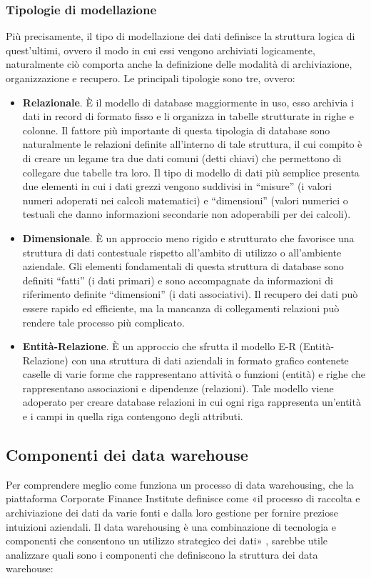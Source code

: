 \subsubsection{Tipologie di modellazione}

Più precisamente, il tipo di modellazione dei dati definisce la struttura logica di quest'ultimi, ovvero il modo in cui essi vengono archiviati logicamente, naturalmente ciò comporta anche la definizione delle modalità di archiviazione, organizzazione e recupero.  Le principali tipologie sono tre, ovvero:\cite{sap_data_modeling}

\begin{itemize}
    \item \textbf{Relazionale}. È il modello di database maggiormente in uso, esso archivia i dati in record di formato fisso e li organizza in tabelle strutturate in righe e colonne. Il fattore più importante di questa tipologia di database sono naturalmente le relazioni definite all'interno di tale struttura, il cui compito è di creare un legame tra due dati comuni (detti chiavi) che permettono di collegare due tabelle tra loro. Il tipo di modello di dati più semplice presenta due elementi in cui i dati grezzi vengono suddivisi in “misure” (i valori numeri adoperati nei calcoli matematici) e “dimensioni” (valori numerici o testuali che danno informazioni secondarie non adoperabili per dei calcoli).
    \item \textbf{Dimensionale}. È un approccio meno rigido e strutturato che favorisce una struttura di dati contestuale rispetto all'ambito di utilizzo o all'ambiente aziendale. Gli elementi fondamentali di questa struttura di database sono definiti “fatti” (i dati primari) e sono accompagnate da informazioni di riferimento definite “dimensioni” (i dati associativi). Il recupero dei dati può essere rapido ed efficiente, ma la mancanza di collegamenti relazioni può rendere tale processo più complicato. 
    \item \textbf{Entità-Relazione}. È un approccio che sfrutta il modello E-R (Entità-Relazione) con una struttura di dati aziendali in formato grafico contenete caselle di varie forme che rappresentano attività o funzioni (entità) e righe che rappresentano associazioni e dipendenze (relazioni). Tale modello viene adoperato per creare database relazioni in cui ogni riga rappresenta un'entità e i campi in quella riga contengono degli attributi.
\end{itemize}

\subsection{Componenti dei data warehouse}
Per comprendere meglio come funziona un processo di data warehousing, che la piattaforma Corporate Finance Institute definisce come «il processo di raccolta e archiviazione dei dati da varie fonti e dalla loro gestione per fornire preziose intuizioni aziendali. Il data warehousing è una combinazione di tecnologia e componenti che consentono un utilizzo strategico dei dati»\cite{cfi_data_warehousing}
, sarebbe utile analizzare quali sono i componenti che definiscono la struttura dei data warehouse:\cite{altexsoft_data_warehouse_concepts}

